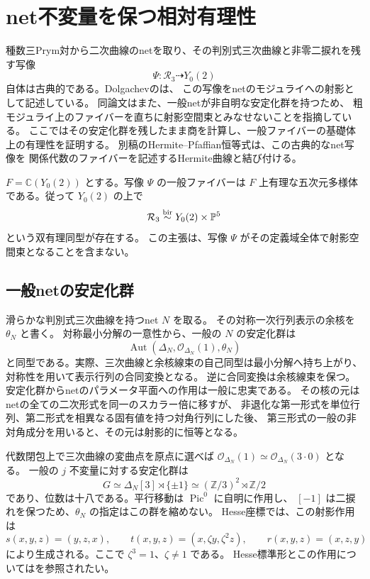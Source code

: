 \section{net不変量を保つ相対有理性}
\label{sec:modular-fiber-rationality-v28}

種数三Prym対から二次曲線のnetを取り、その判別式三次曲線と非零二捩れを残す写像
\[
 \Psi:\mathcal R_3\dashrightarrow Y_0(2)
\]
自体は古典的である。Dolgachevの\cite[\S4, Remark 4.1]{DolgachevRationality2008}は、
この写像をnetのモジュライへの射影として記述している。
同論文はまた、一般netが非自明な安定化群を持つため、
粗モジュライ上のファイバーを直ちに射影空間束とみなせないことを指摘している。
ここではその安定化群を残したまま商を計算し、一般ファイバーの基礎体上の有理性を証明する。
別稿\cite{PaperV}のHermite--Pfaffian恒等式は、この古典的なnet写像を
関係代数のファイバーを記述するHermite曲線と結び付ける。

\begin{theorem}[net写像の相対双有理自明性]
\label{thm:modular-fiber-rationality-v28}
$F=\mathbb C(Y_0(2))$ とする。写像 $\Psi$ の一般ファイバーは
$F$ 上有理な五次元多様体である。従って $Y_0(2)$ の上で
\[
 \mathcal R_3\mathrel{\overset{\mathrm{bir}}{\sim}} Y_0(2)\times\mathbb P^5
\]
という双有理同型が存在する。
この主張は、写像 $\Psi$ がその定義域全体で射影空間束となることを含まない。
\end{theorem}

\subsection{一般netの安定化群}

滑らかな判別式三次曲線を持つnet $N$ を取る。
その対称一次行列表示の余核を $\theta_N$ と書く。
対称最小分解の一意性から、一般の $N$ の安定化群は
\[
 \operatorname{Aut}(\Delta_N,\mathcal O_{\Delta_N}(1),\theta_N)
\]
と同型である。実際、三次曲線と余核線束の自己同型は最小分解へ持ち上がり、
対称性を用いて表示行列の合同変換となる。
逆に合同変換は余核線束を保つ。
安定化群からnetのパラメータ平面への作用は一般に忠実である。
その核の元はnetの全ての二次形式を同一のスカラー倍に移すが、
非退化な第一形式を単位行列、第二形式を相異なる固有値を持つ対角行列にした後、
第三形式の一般の非対角成分を用いると、その元は射影的に恒等となる。

代数閉包上で三次曲線の変曲点を原点に選べば
$\mathcal O_{\Delta_N}(1)\simeq\mathcal O_{\Delta_N}(3\cdot0)$ となる。
一般の $j$ 不変量に対する安定化群は
\[
 G\simeq\Delta_N[3]\rtimes\{\pm1\}
       \simeq (\mathbb Z/3)^2\rtimes\mathbb Z/2
\]
であり、位数は十八である。平行移動は $\operatorname{Pic}^0$ に自明に作用し、
$[-1]$ は二捩れを保つため、$\theta_N$ の指定はこの群を縮めない。
Hesse座標では、この射影作用は
\[
 s(x,y,z)=(y,z,x),\qquad
 t(x,y,z)=(x,\zeta y,\zeta^2z),\qquad
 r(x,y,z)=(x,z,y)
\]
により生成される。ここで $\zeta^3=1$、$\zeta\ne1$ である。
Hesse標準形とこの作用については\cite[\S2, \S4]{ArtebaniDolgachevHesse}を参照されたい。

